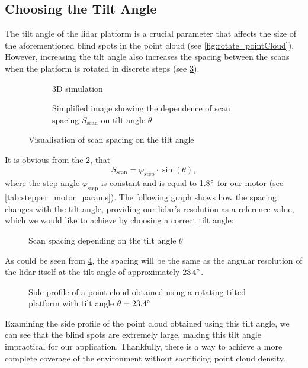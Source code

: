 \subsection{Choosing the Tilt Angle}
The tilt angle of the \gls{lidar} platform is a crucial parameter that affects the size of the aforementioned blind spots in the point cloud (see \cref{fig:rotate_pointCloud}).
However, increasing the tilt angle also increases the spacing between the scans when the platform is rotated in discrete steps (see \cref{fig:scan_spacing}). 
\begin{figure}[h!]
    \centering
    
    \begin{subfigure}{0.45\linewidth}
        \centering
        
        \caption{3D simulation}
        \label{fig:scan_spacing:3d}
    \end{subfigure}
    \hfill
    \begin{subfigure}{0.45\linewidth}
        \centering
        
        \caption{Simplified image showing the dependence of scan spacing $S_{\text{scan}}$ on tilt angle $\theta$}
        \label{fig:scan_spacing:tikz}
    \end{subfigure}

    \caption{Visualisation of scan spacing on the tilt angle}
    \label{fig:scan_spacing}
\end{figure}
It is obvious from the \cref{fig:scan_spacing:tikz}, that
\begin{equation}
    S_{\text{scan}} = \varphi_{\text{step}}\cdot\sin(\theta),
\end{equation}
where the step angle $\varphi_{\text{step}}$ is constant and is equal to 1.8$\degree$ for our motor (see \cref{tab:stepper_motor_params}).
The following graph shows how the spacing changes with the tilt angle, providing our \gls{lidar}'s resolution as a reference value, which we would like to achieve by choosing a correct tilt angle:
\begin{figure}[H]
    \centering
    
    \caption{Scan spacing depending on the tilt angle $\theta$}
    \label{fig:angleRes_tiltOnly}
\end{figure}    
As could be seen from \cref{fig:angleRes_tiltOnly}, the spacing will be the same as the angular resolution of the \gls{lidar} itself at the tilt angle of approximately $\si{23.4}{\degree}$.
\begin{figure}[H]
    \centering
    
    \caption{Side profile of a point cloud obtained using a rotating tilted platform with tilt angle $\theta=23.4\degree$}
    \label{fig:23point4rotate_pointCloud}
\end{figure}
Examining the side profile of the point cloud obtained using this tilt angle, we can see that the blind spots are extremely large, making this tilt angle impractical for our application.
Thankfully, there is a way to achieve a more complete coverage of the environment without sacrificing point cloud density.
